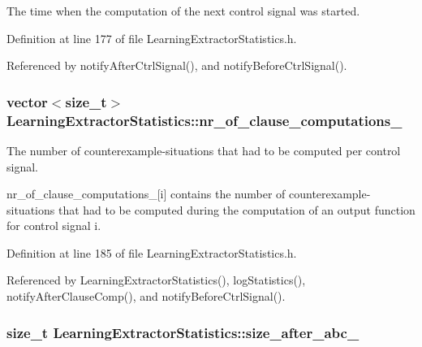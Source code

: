 The time when the computation of the next control signal was started. 



Definition at line 177 of file Learning\-Extractor\-Statistics.\-h.



Referenced by notify\-After\-Ctrl\-Signal(), and notify\-Before\-Ctrl\-Signal().

\hypertarget{classLearningExtractorStatistics_a20b2771dd74bd0e2e08d7568149bef14}{
\subsubsection[{nr\-\_\-of\-\_\-clause\-\_\-computations\-\_\-}]{\setlength{\rightskip}{0pt plus 5cm}vector$<$size\-\_\-t$>$ Learning\-Extractor\-Statistics\-::nr\-\_\-of\-\_\-clause\-\_\-computations\-\_\-\hspace{0.3cm}{\ttfamily [protected]}}}\label{classLearningExtractorStatistics_a20b2771dd74bd0e2e08d7568149bef14}


The number of counterexample-\/situations that had to be computed per control signal. 

nr\-\_\-of\-\_\-clause\-\_\-computations\-\_\-\mbox{[}i\mbox{]} contains the number of counterexample-\/situations that had to be computed during the computation of an output function for control signal i. 

Definition at line 185 of file Learning\-Extractor\-Statistics.\-h.



Referenced by Learning\-Extractor\-Statistics(), log\-Statistics(), notify\-After\-Clause\-Comp(), and notify\-Before\-Ctrl\-Signal().

\hypertarget{classLearningExtractorStatistics_a6684883b2634d0ea619aaf145eb86b8d}{
\subsubsection[{size\-\_\-after\-\_\-abc\-\_\-}]{\setlength{\rightskip}{0pt plus 5cm}size\-\_\-t Learning\-Extractor\-Statistics\-::size\-\_\-after\-\_\-abc\-\_\-\hspace{0.3cm}{\ttfamily [protected]}}}\label{classLearningExtractorStatistics_a6684883b2634d0ea619aaf145eb86b8d}


